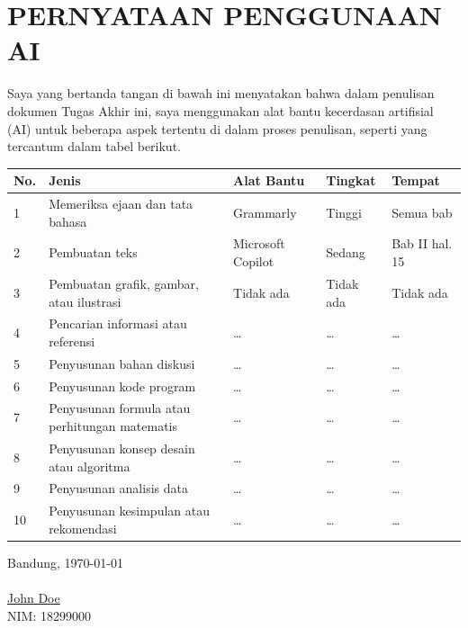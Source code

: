 \chapter*{PERNYATAAN PENGGUNAAN AI}
Saya yang bertanda tangan di bawah ini menyatakan bahwa dalam penulisan dokumen Tugas Akhir ini,
saya menggunakan alat bantu kecerdasan artifisial (AI) untuk beberapa aspek tertentu di dalam proses penulisan,
seperti yang tercantum dalam tabel berikut.
\begin{table}[h]
\begin{tabular}{|p{0.5cm}| p{4cm} | p{2.5cm} | p{2.5cm} | p{3cm} @{}| }
\hline
\textbf{No.} & \textbf{Jenis} & \textbf{Alat Bantu} & \textbf{Tingkat} & \textbf{Tempat}\\
\hline
1 & Memeriksa ejaan dan tata bahasa & Grammarly & Tinggi & Semua bab \\
\hline
2 & Pembuatan teks & Microsoft Copilot & Sedang & Bab II hal. 15 \\
\hline
3 & Pembuatan grafik, gambar, atau ilustrasi & Tidak ada & Tidak ada & Tidak ada \\
\hline
4 & Pencarian informasi atau referensi & \ldots & \ldots & \ldots \\
\hline
5 & Penyusunan bahan diskusi & \ldots & \ldots & \ldots \\
\hline
6 & Penyusunan kode program & \ldots & \ldots & \ldots \\
\hline
7 & Penyusunan formula atau perhitungan matematis & \ldots & \ldots & \ldots \\
\hline
8 & Penyusunan konsep desain atau algoritma & \ldots & \ldots & \ldots \\
\hline
9 & Penyusunan analisis data & \ldots & \ldots & \ldots \\
\hline
10 & Penyusunan kesimpulan atau rekomendasi & \ldots & \ldots & \ldots \\
\hline
\end{tabular}
\end{table}


Bandung, \today\\
\\[2cm]

\underline{John Doe} \\
NIM: 18299000